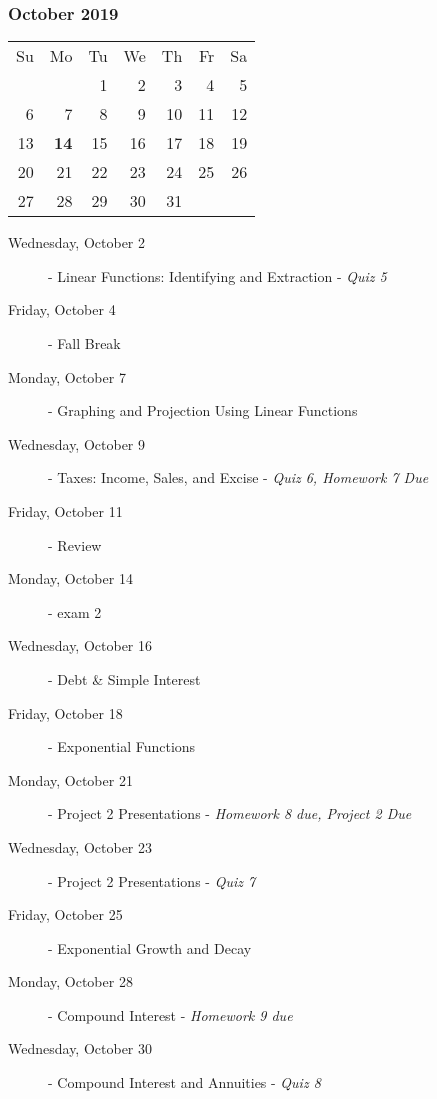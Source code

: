\subsubsection*{October 2019}
\begin{tabular}{rrrrrrr}
Su & Mo & Tu & We & Th & Fr & Sa\\
   &    &  1 &  2 &  3 &  4 &  5\\
 6 &  7 &  8 &  9 & 10 & 11 & 12\\
13 & {\bf 14} & 15 & 16 & 17 & 18 & 19\\ 
20 & 21 & 22 & 23 & 24 & 25 & 26\\ 
27 & 28 & 29 & 30 & 31 &    &   \\
\end{tabular}
\begin{description}
\item[Wednesday, October 2]
  - Linear Functions: Identifying and Extraction - {\em Quiz 5}
\item[Friday, October 4] - Fall Break

\item[Monday, October 7]
  - Graphing and Projection Using Linear Functions  
\item[Wednesday, October 9] 
  - Taxes: Income, Sales, and Excise - {\em Quiz 6, Homework 7 Due}
\item[Friday, October 11]
  - Review
\item[Monday, October 14]
  - exam 2 
\item[Wednesday, October 16]
  - Debt \& Simple Interest 
\item[Friday, October 18]
  - Exponential Functions

\item[Monday, October 21]
  - Project 2 Presentations - {\em Homework 8 due, Project 2 Due}
\item[Wednesday, October 23]
  - Project 2 Presentations - {\em Quiz 7}
\item[Friday, October 25]
  - Exponential Growth and Decay 

\item[Monday, October 28]
  - Compound Interest  - {\em Homework 9 due}
\item[Wednesday, October 30]
  - Compound Interest and Annuities - {\em Quiz 8}
\end{description}

\hrulefill
